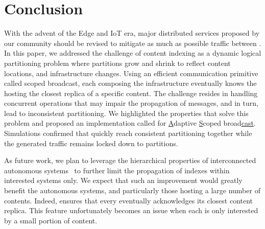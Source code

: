 \section{Conclusion}
\label{sec:conclusion}

With the advent of the Edge and IoT era, major distributed services
proposed by our community should be revised to mitigate as much as
possible traffic between \processes.  In this paper, we addressed the
challenge of content indexing as a dynamic logical partitioning
problem where partitions grow and shrink to reflect content locations,
and infrastructure changes.  Using an efficient communication
primitive called scoped broadcast, each \process composing the
infrastructure eventually knows the \process hosting the closest replica
of a specific content.  The challenge resides in handling concurrent
operations that may impair the propagation of messages, and in turn,
lead to inconsistent partitioning.
%
We highlighted the properties that solve this problem and proposed an
implementation called \NAME for \underline{A}daptive
\underline{S}coped broad\underline{cast}.  Simulations confirmed that
\processes quickly reach consistent partitioning together while the
generated traffic remains locked down to partitions.

As future work, we plan to leverage the hierarchical properties of
interconnected autonomous systems~\cite{nur2018geography} to further
limit the propagation of indexes within interested systems only.  We
expect that such an improvement would greatly benefit the autonomous
systems, and particularly those hosting a large number of contents.
Indeed, \NAME ensures that every \process eventually acknowledges its
closest content replica. This feature unfortunately becomes an issue
when each \process is only interested by a small portion of
content.

